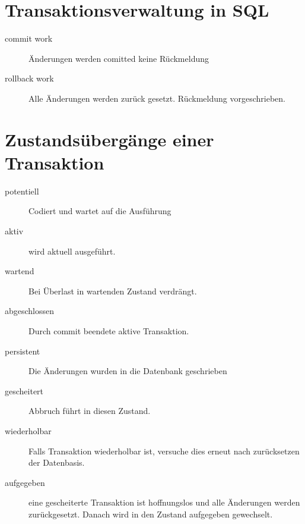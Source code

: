 \section{Transaktionsverwaltung in SQL}
\begin{description}
\item[commit work] Änderungen werden comitted keine Rückmeldung
\item[rollback work] Alle Änderungen werden zurück gesetzt. Rückmeldung vorgeschrieben. 
\end{description}
\section{Zustandsübergänge einer Transaktion}
\begin{description}
\item[potentiell] Codiert und wartet auf die Ausführung
\item[aktiv] wird aktuell ausgeführt. 
\item[wartend] Bei Überlast in wartenden Zustand verdrängt. 
\item[abgeschlossen] Durch commit beendete aktive Transaktion.
\item[persistent] Die Änderungen wurden in die Datenbank geschrieben
\item[gescheitert] Abbruch führt in diesen Zustand. 
\item[wiederholbar] Falls Transaktion wiederholbar ist, versuche dies erneut nach zurücksetzen der Datenbasis.
\item[aufgegeben] eine gescheiterte Transaktion ist hoffnungslos und alle Änderungen werden zurückgesetzt. Danach wird in den Zustand aufgegeben gewechselt.
\end{description}